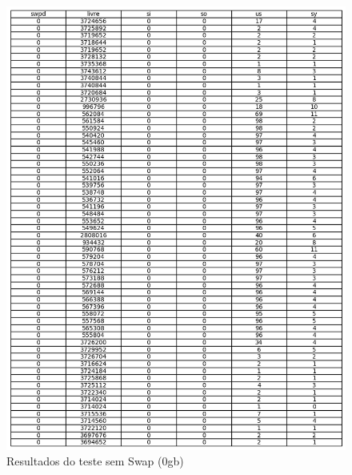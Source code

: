 \documentclass[
	12pt,				%
	openright,			%
	oneside,			%
	a4paper,			%
	chapter=TITLE,		%
	english,			%
	french,				%
	spanish,			%
	brazil				%
	]{abntex2}
\theoremstyle{definition}
\begin{document}
\begin{figure}[H]
	\centering
	\includegraphics[width=1.0\textwidth]{swap0gb.png}
	\caption{Resultados do teste sem Swap (0gb)}
	\label{fig:swap0}
\end{figure}
\end{document}
